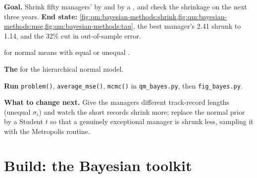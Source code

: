 \begin{tutorial}
\textbf{Goal.} Shrink fifty managers'  by  and by a , and check the shrinkage on the next three
years. \textbf{End state:} \cref{fig:qm:bayesian-methods:shrink,fig:qm:bayesian-methods:mse,fig:qm:bayesian-methods:tau}, the best
manager's 2.41 shrunk to 1.14, and the 32\% cut in out-of-sample error.
\begin{tutsteps}
\item \textbf{} for normal means with equal or unequal .
\label{lst:qm:bayesian-methods:eb}
\item \textbf{The } for the hierarchical normal model.
\label{lst:qm:bayesian-methods:gibbs}
\item \textbf{Run} \texttt{problem()}, \texttt{average\_mse()}, \texttt{mcmc()} in \texttt{qm\_bayes.py}, then \texttt{fig\_bayes.py}.
\end{tutsteps}
\textbf{What to change next.} Give the managers different track-record lengths (unequal $\sigma_i$) and watch the short records shrink
more; replace the normal prior by a Student $t$ so that a genuinely exceptional manager is shrunk less, sampling it with the Metropolis
routine.
\end{tutorial}

\section{Build: the Bayesian toolkit}\label{bld:qm:bayesian-methods:bayes}

